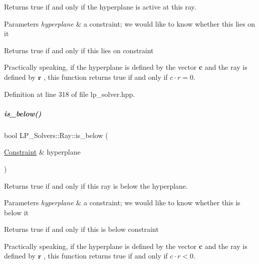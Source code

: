 Returns {\ttfamily true} if and only if the hyperplane is active at this ray. 


\begin{DoxyParams}{Parameters}
{\em hyperplane} & a constraint; we would like to know whether {\ttfamily this} lies on it \\
\hline
\end{DoxyParams}
\begin{DoxyReturn}{Returns}
true if and only if {\ttfamily this} lies on {\ttfamily constraint} 
\end{DoxyReturn}
Practically speaking, if the hyperplane is defined by the vector $ \mathbf c $ and the ray is defined by $ \mathbf r $ , this function returns true if and only if $ c\cdot r = 0 $. 

Definition at line 318 of file lp\+\_\+solver.\+hpp.

\mbox{\label{group___c_l_s_solvers_a4bdad8c5669c06827f3984583e764353}} 
\subparagraph{\texorpdfstring{is\+\_\+below()}{is\_below()}}
{\footnotesize\ttfamily bool L\+P\+\_\+\+Solvers\+::\+Ray\+::is\+\_\+below (\begin{DoxyParamCaption}\item[{\hyperlink{group___c_l_s_solvers_class_l_p___solvers_1_1_constraint}{Constraint} \&}]{hyperplane }\end{DoxyParamCaption})\hspace{0.3cm}{\ttfamily [inline]}}



Returns {\ttfamily true} if and only if this ray is below the hyperplane. 


\begin{DoxyParams}{Parameters}
{\em hyperplane} & a constraint; we would like to know whether {\ttfamily this} is below it \\
\hline
\end{DoxyParams}
\begin{DoxyReturn}{Returns}
true if and only if {\ttfamily this} is below {\ttfamily constraint} 
\end{DoxyReturn}
Practically speaking, if the hyperplane is defined by the vector $ \mathbf c $ and the ray is defined by $ \mathbf r $ , this function returns true if and only if $ c\cdot r < 0 $. 

